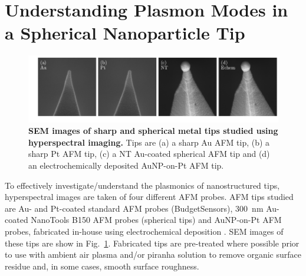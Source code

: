 \documentclass{article}
\begin{document}
\section{Understanding Plasmon Modes in a Spherical Nanoparticle Tip}

\begin{figure}[bt]
\centering
\includegraphics{figures/tip_sems}
\caption[SEM images of sharp and spherical metal tips studied using hyperspectral imaging]{\textbf{SEM images of sharp and spherical metal tips studied using hyperspectral imaging.} Tips are  (a) a sharp Au AFM tip, (b) a sharp Pt AFM tip, (c) a NT Au-coated spherical AFM tip and (d) an electrochemically deposited AuNP-on-Pt AFM tip.}
\label{fig:tip_sems}
\vspace{-10pt}
\end{figure}

To effectively {\color{red}investigate/understand} the plasmonics of nanostructured tips, hyperspectral images are taken of four different AFM probes. AFM tips studied are Au- and Pt-coated standard AFM probes (BudgetSensors), \SI{300}{nm} Au-coated NanoTools B150 AFM probes {\color{red}(spherical tips)} \cite{savage2012} and AuNP-on-Pt AFM probes, fabricated in-house using electrochemical deposition \cite{sanders2014}. SEM images of these tips are show in Fig.~{\ref{fig:tip_sems}}.
Fabricated tips are pre-treated where possible prior to use with ambient air plasma and/or piranha solution to remove organic surface residue and, in some cases, smooth surface roughness.
\end{document}
